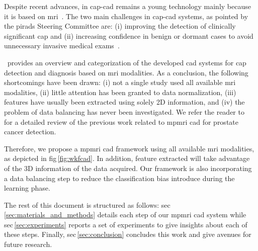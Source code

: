 \documentclass[a4paper,num-refs]{wiley-article}
\begin{document}
Despite recent advances, in \ac{cap}-\ac{cad} remains a young technology mainly
because it is based on \ac{mri}~\cite{Hegde2013}. The two main challenges in
\ac{cap}-\ac{cad} systems, as pointed by the \ac{pirads} Steering Committee
are: (i) improving the detection of clinically significant \ac{cap} and (ii)
increasing confidence in benign or dormant cases to avoid unnecessary invasive
medical exams~\citep{weinreb2016pi}.


\citeauthor{lemaitre2015computer}\,\cite{lemaitre2015computer} provides an
overview and categorization of the developed \acs{cad} systems for \ac{cap}
detection and diagnosis based on \ac{mri} modalities. As a conclusion, the
following shortcomings have been drawn: (i) not a single study used all available
\ac{mri} modalities, (ii) little attention has been granted to data
normalization, (iii) features have usually been extracted using solely 2D
information, and (iv) the problem of data balancing has never been
investigated. We refer the reader to~\cite{lemaitre2015computer} for a detailed
review of the previous work related to \ac{mpmri} \ac{cad} for prostate cancer
detection.

Therefore, we propose a \ac{mpmri} \ac{cad} framework using all available
\ac{mri} modalities, as depicted in \acs{fig}\,\ref{fig:wkfcad}. In addition,
feature extracted will take advantage of the 3D information of the data
acquired. Our framework is also incorporating a data balancing step to reduce
the classification bias introduce during the learning phase.


The rest of this document is structured as follows:
\acs{sec}\,\ref{sec:materials_and_methods} details each step of our \ac{mpmri}
\ac{cad} system while \acs{sec}\,\ref{sec:experiments} reports a set of
experiments to give insights about each of these steps. Finally,
\ac{sec}\,\ref{sec:conclusion} concludes this work and give avenues for future
research.
\end{document}
